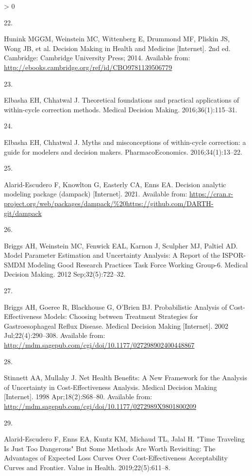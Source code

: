 \documentclass[
]{article}
\newlength{\cslhangindent}
\newlength{\csllabelwidth}
\newenvironment{CSLReferences}[2] %
 {%
  \setlength{\parindent}{0pt}
  \ifodd #1 \everypar{\setlength{\hangindent}{\cslhangindent}}\ignorespaces\fi
  \ifnum #2 > 0
  \setlength{\parskip}{#2\baselineskip}
  \fi
 }%
 {}
\newcommand{\CSLLeftMargin}[1]{\parbox[t]{\csllabelwidth}{#1}}
\newcommand{\CSLRightInline}[1]{\parbox[t]{\linewidth - \csllabelwidth}{#1}\break}
\begin{document}
\begin{CSLReferences}{0}{0}
\leavevmode\hypertarget{ref-Hunink2014}{}%
\CSLLeftMargin{22. }
\CSLRightInline{Hunink MGGM, Weinstein MC, Wittenberg E, Drummond MF, Pliskin JS, Wong JB, et al. {Decision Making in Health and Medicine} {[}Internet{]}. 2nd ed. Cambridge: Cambridge University Press; 2014. Available from: \url{http://ebooks.cambridge.org/ref/id/CBO9781139506779}}

\leavevmode\hypertarget{ref-Elbasha2016}{}%
\CSLLeftMargin{23. }
\CSLRightInline{Elbasha EH, Chhatwal J. {Theoretical foundations and practical applications of within-cycle correction methods}. Medical Decision Making. 2016;36(1):115--31. }

\leavevmode\hypertarget{ref-Elbasha2016a}{}%
\CSLLeftMargin{24. }
\CSLRightInline{Elbasha EH, Chhatwal J. {Myths and misconceptions of within-cycle correction: a guide for modelers and decision makers}. PharmacoEconomics. 2016;34(1):13--22. }

\leavevmode\hypertarget{ref-Alarid-Escudero2021}{}%
\CSLLeftMargin{25. }
\CSLRightInline{Alarid-Escudero F, Knowlton G, Easterly CA, Enns EA. Decision analytic modeling package (dampack) {[}Internet{]}. 2021. Available from: \url{https://cran.r-project.org/web/packages/dampack/\%20https://github.com/DARTH-git/dampack}}

\leavevmode\hypertarget{ref-Briggs2012}{}%
\CSLLeftMargin{26. }
\CSLRightInline{Briggs AH, Weinstein MC, Fenwick EAL, Karnon J, Sculpher MJ, Paltiel AD. {Model Parameter Estimation and Uncertainty Analysis: A Report of the ISPOR-SMDM Modeling Good Research Practices Task Force Working Group-6.} Medical Decision Making. 2012 Sep;32(5):722--32. }

\leavevmode\hypertarget{ref-Briggs2002}{}%
\CSLLeftMargin{27. }
\CSLRightInline{Briggs AH, Goeree R, Blackhouse G, O'Brien BJ. {Probabilistic Analysis of Cost-Effectiveness Models: Choosing between Treatment Strategies for Gastroesophageal Reflux Disease}. Medical Decision Making {[}Internet{]}. 2002 Jul;22(4):290--308. Available from: \url{http://mdm.sagepub.com/cgi/doi/10.1177/027298902400448867}}

\leavevmode\hypertarget{ref-Stinnett1998b}{}%
\CSLLeftMargin{28. }
\CSLRightInline{Stinnett AA, Mullahy J. {Net Health Benefits: A New Framework for the Analysis of Uncertainty in Cost-Effectiveness Analysis}. Medical Decision Making {[}Internet{]}. 1998 Apr;18(2):S68--80. Available from: \url{http://mdm.sagepub.com/cgi/doi/10.1177/0272989X9801800209}}

\leavevmode\hypertarget{ref-Alarid-Escudero2019}{}%
\CSLLeftMargin{29. }
\CSLRightInline{Alarid-Escudero F, Enns EA, Kuntz KM, Michaud TL, Jalal H. {"Time Traveling Is Just Too Dangerous" But Some Methods Are Worth Revisiting: The Advantages of Expected Loss Curves Over Cost-Effectiveness Acceptability Curves and Frontier}. Value in Health. 2019;22(5):611--8. }


\end{CSLReferences}
\end{document}
